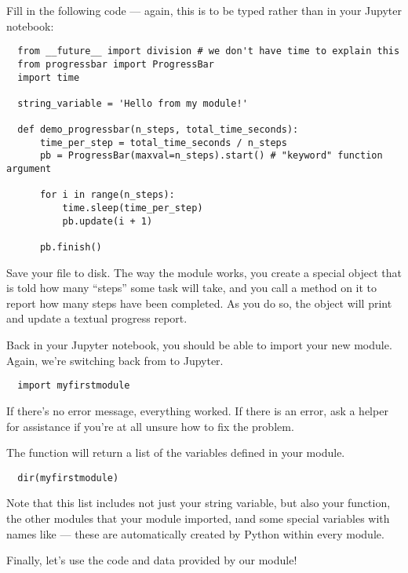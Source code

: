 \documentclass[letterpaper, 12pt, titlepage, twoside]{article}
\begin{document}

Fill in the following code --- again, this is to be typed  rather
than in your Jupyter notebook:

\begin{lstlisting}
  from __future__ import division # we don't have time to explain this
  from progressbar import ProgressBar
  import time

  string_variable = 'Hello from my module!'

  def demo_progressbar(n_steps, total_time_seconds):
      time_per_step = total_time_seconds / n_steps
      pb = ProgressBar(maxval=n_steps).start() # "keyword" function argument

      for i in range(n_steps):
          time.sleep(time_per_step)
          pb.update(i + 1)

      pb.finish()
\end{lstlisting}

Save your file to disk. The way the  module works, you create a
special object that is told how many ``steps'' some task will take, and you
call a method  on it to report how many steps have been completed.
As you do so, the object will print and update a textual progress report.

Back in your Jupyter notebook, you should be able to import your new module.
Again, we're switching back from  to Jupyter.

\begin{lstlisting}
  import myfirstmodule
\end{lstlisting}

If there's no error message, everything worked. If there is an error, ask a
helper for assistance if you're at all unsure how to fix the problem.

The  function will return a list of the variables defined in your
module.

\begin{lstlisting}
  dir(myfirstmodule)
\end{lstlisting}

Note that this list includes not just your string variable, but also your
function, the other modules that your module imported, \i{and} some special
variables with names like  --- these are automatically
created by Python within every module.

Finally, let's use the code and data provided by our module!
\end{document}
